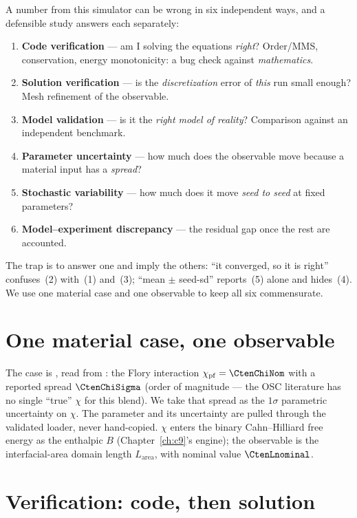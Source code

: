 A number from this simulator can be wrong in six independent ways, and a
defensible study answers each separately:
\begin{enumerate}[nosep]
  \item \textbf{Code verification} --- am I solving the equations
        \emph{right}? Order/MMS, conservation, energy monotonicity: a bug
        check against \emph{mathematics}.
  \item \textbf{Solution verification} --- is the \emph{discretization}
        error of \emph{this} run small enough? Mesh refinement of the
        observable.
  \item \textbf{Model validation} --- is it the \emph{right model of
        reality}? Comparison against an independent benchmark.
  \item \textbf{Parameter uncertainty} --- how much does the observable
        move because a material input has a \emph{spread}?
  \item \textbf{Stochastic variability} --- how much does it move
        \emph{seed to seed} at fixed parameters?
  \item \textbf{Model--experiment discrepancy} --- the residual gap once
        the rest are accounted.
\end{enumerate}
The trap is to answer one and imply the others: ``it converged, so it is
right'' confuses~(2) with~(1) and~(3); ``mean $\pm$ seed-sd'' reports~(5)
alone and hides~(4). We use one material case and one observable to keep
all six commensurate.

\section{One material case, one observable}

The case is \CtenMaterial, read from : the Flory
interaction $\chi_{\mathrm{pf}}=\CtenChiNom$ with a reported spread
$\CtenChiSigma$ (order of magnitude --- the OSC literature has no single
``true'' $\chi$ for this blend). We take that spread as the $1\sigma$
parametric uncertainty on $\chi$. The parameter and its uncertainty are
pulled through the validated loader, never hand-copied. $\chi$ enters the
binary Cahn--Hilliard free energy as the enthalpic $B$
(Chapter~\ref{ch:c9}'s engine); the observable is the interfacial-area
domain length $L_{\mathrm{area}}$, with nominal value $\CtenLnominal$.

\section{Verification: code, then solution}


